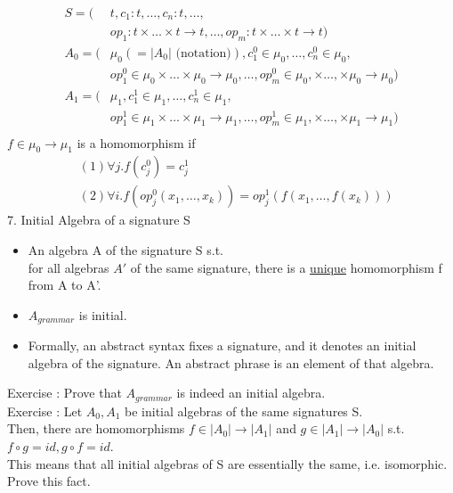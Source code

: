 \documentclass{report}[12pt]
\begin{document}
\begin{align*}
    S=(&t, c_1:t, \ldots, c_n:t, \ldots, \\
    &op_1 :t\times \ldots \times t \rightarrow t , \ldots, op_m : t \times \ldots \times t \rightarrow t) \\
    A_0 = (&\mu_0(=|A_0|\text{ (notation)}), c_1^0 \in \mu_0, \ldots, c_n^0 \in \mu_0, \\
    &op_1^0 \in \mu_0 \times \ldots \times \mu_0 \rightarrow \mu_0, \ldots, op_m^0 \in \mu_0, \times \ldots, \times \mu_0 \rightarrow \mu_0) \\
    A_1 = (&\mu_1, c_1^1 \in \mu_1, \ldots, c_n^1 \in \mu_1, \\
    &op_1^1 \in \mu_1 \times \ldots \times \mu_1 \rightarrow \mu_1, \ldots, op_m^1 \in \mu_1, \times \ldots, \times \mu_1 \rightarrow \mu_1) \\
\end{align*}
$f\in \mu_0 \rightarrow \mu_1$ is a homomorphism if
\begin{align*}
    &(1) \forall j. f(c_j^0) = c_j^1  \\
    &(2) \forall i. f(op_j^0(x_1, \ldots, x_k)) = op_j^1 (f(x_1, \ldots, f(x_k)))
\end{align*}
7. Initial Algebra of a signature S\\
\begin{itemize}
    \item An algebra A of the signature S s.t. \\
    for all algebras $A'$ of the same signature, there is a \underline{unique} homomorphism f from A to A'.
    \item $A_{grammar}$ is initial.
    \item Formally, an abstract syntax fixes a signature, and it denotes an initial algebra of the signature. An abstract phrase is an element of that algebra.
\end{itemize}
Exercise : Prove that $A_{grammar}$ is indeed an initial algebra. \\
Exercise : Let $A_0, A_1$ be initial algebras of the same signatures S. \\
Then, there are homomorphisms $f\in |A_0| \rightarrow |A_1|$ and $g \in |A_1| \rightarrow |A_0|$ s.t. $f\circ g = id, g\circ f = id$. \\
This means that all initial algebras of S are essentially the same, i.e. isomorphic. Prove this fact.
\end{document}
